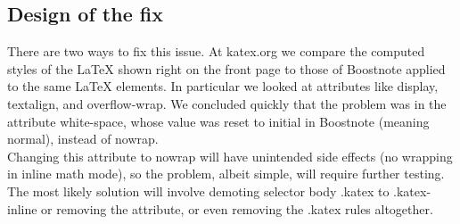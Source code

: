 \documentclass[main.tex]{subfiles}
\begin{document}
\subsection{Design of the fix}

There are two ways to fix this issue. At katex.org we compare the computed styles of the LaTeX shown right on the front page to those of Boostnote applied to the same LaTeX elements. In particular we looked at attributes like display, textalign, and overflow-wrap. We concluded quickly that the problem was in the attribute white-space, whose value was reset to initial in Boostnote (meaning normal), instead of nowrap.\\

Changing this attribute to nowrap will have unintended side effects (no wrapping in inline math mode), so the problem, albeit simple, will require further testing. The most likely solution will involve demoting selector body .katex to .katex-inline or removing the attribute, or even removing the .katex rules altogether.

\nocite{*}
\end{document}
